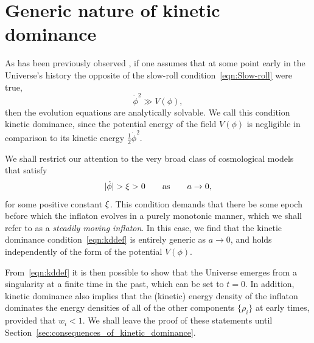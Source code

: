 \section{Generic nature of kinetic dominance}
\label{sec:The_generic_nature_of_kinetic_dominance}

As has been previously observed \citep{Linde_initial_conditions_1985, belinsky_inflationary_1985,particle_astrophysics_1990}, if one assumes that at some point early in the Universe's history the opposite of the slow-roll condition~\eqref{eqn:Slow-roll} were true,
%
\begin{equation}
  \dot\phi^2\gg V(\phi),
  \label{eqn:kddef}
\end{equation}
%
then the evolution equations are analytically solvable.  We call this condition kinetic dominance, since the potential energy of the field $V(\phi)$ is negligible in comparison to its kinetic energy $\frac{1}{2}\dot\phi^2$.

We shall restrict our attention to the very broad class of cosmological models that satisfy
%
\begin{equation}
|\dot{\phi}| > \xi > 0 \qquad \text{as} \qquad a\to 0, 
\label{eqn:conditions}
\end{equation}
%
for some positive constant $\xi$.  This condition demands that there be some epoch before which the inflaton evolves in a purely monotonic manner, which we shall refer to as a {\em steadily moving inflaton}. In this case, we find that the kinetic dominance condition~\eqref{eqn:kddef} is entirely generic as $a \to 0$, and holds independently of the form of the potential $V(\phi)$.

From~\eqref{eqn:kddef} it is then possible to show that the Universe emerges from a singularity at a finite time in the past, which can be set to $t=0$. In addition, kinetic dominance also implies that the (kinetic) energy density of the inflaton dominates the energy densities of all of the other components $\{\rho_i\}$ at early times, provided that $w_i<1$. We shall leave the proof of these statements until Section~\ref{sec:consequences_of_kinetic_dominance}. 

